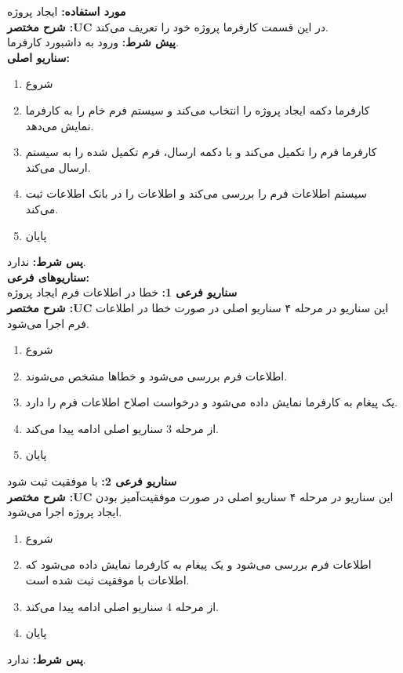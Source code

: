 \textbf{مورد استفاده:}
ایجاد پروژه
\\
\textbf{شرح مختصر :UC}
در این قسمت کارفرما پروژه خود را تعریف می‌کند.
\\
\textbf{پيش شرط:}
ورود به داشبورد کارفرما.
\\
\textbf{سناريو اصلی:}
\begin{enumerate}
\item
شروع
\item
کارفرما دکمه ایجاد پروژه را انتخاب می‌کند و سیستم فرم خام را به کارفرما نمایش می‌دهد.
\item
کارفرما فرم را تکمیل می‌کند و با دکمه ارسال، فرم تکمیل شده را به سیستم ارسال می‌کند.
\item
سیستم اطلاعات فرم را بررسی می‌کند و اطلاعات را در بانک اطلاعات ثبت می‌کند.
\item
پایان
\end{enumerate}

\noindent
\textbf{پس شرط:}
ندارد.
\\
\textbf{سناريوهای فرعی:}
\\
\textbf{سناريو فرعی 1:}
خطا در اطلاعات فرم ایجاد پروژه
\\
\textbf{شرح مختصر :UC}
این سناریو در مرحله ۴ سناریو اصلی در صورت خطا در اطلاعات فرم اجرا می‌شود.
\begin{enumerate}
\item
شروع
\item
اطلاعات فرم بررسی می‌شود و خطاها مشخص می‌شوند.
\item
یک پیغام به کارفرما نمایش داده می‌شود و درخواست اصلاح اطلاعات فرم را دارد.
\item
از مرحله 3 سناریو اصلی ادامه پیدا می‌کند.
\item
پایان
\end{enumerate}

\noindent
\textbf{سناريو فرعی 2:}
با موفقیت ثبت شود
\\
\textbf{شرح مختصر :UC}
این سناریو در مرحله ۴ سناریو اصلی در صورت موفقیت‌آمیز بودن ایجاد پروژه اجرا می‌شود.
\begin{enumerate}
\item
شروع
\item
اطلاعات فرم بررسی می‌شود و یک پیغام به کارفرما نمایش داده می‌شود که اطلاعات با موفقیت ثبت شده است.
\item
از مرحله 4 سناریو اصلی ادامه پیدا می‌کند.
\item
پایان
\end{enumerate}

\noindent
\textbf{پس شرط:}
ندارد.


